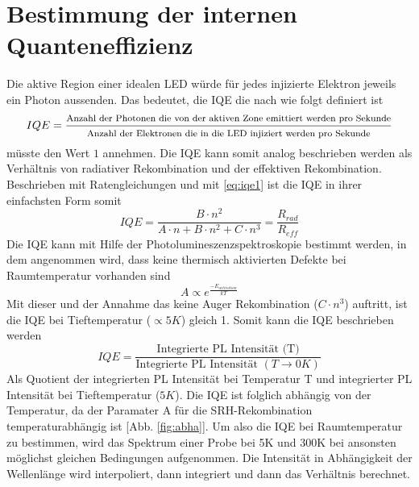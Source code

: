 
\section{Bestimmung der internen Quanteneffizienz}
\thispagestyle{fancy}

Die aktive Region einer idealen LED würde für jedes injizierte Elektron jeweils ein Photon aussenden. 
Das bedeutet, die IQE die nach \cite{schub} wie folgt definiert ist
\begin{equation}
    IQE = \frac{ \footnotesize \text{Anzahl der Photonen die von der aktiven Zone emittiert werden pro Sekunde}}{ \footnotesize \text{Anzahl der Elektronen die in die LED injiziert werden pro Sekunde}}
\end{equation}
müsste den Wert $1$ annehmen. Die IQE kann somit analog beschrieben werden als Verhältnis von radiativer Rekombination und der effektiven Rekombination. Beschrieben mit Ratengleichungen und mit \ref{eq:iqe1} ist die IQE in ihrer einfachsten Form somit
\begin{equation}
    IQE = \frac{B \cdot n^2}{A \cdot n + B \cdot n^2 + C \cdot n^3} = \frac{R_{rad}}{R_{eff}}
\end{equation}
Die IQE kann mit Hilfe der Photolumineszenzspektroskopie bestimmt werden, in dem angenommen wird, dass keine thermisch aktivierten Defekte bei Raumtemperatur vorhanden sind
\begin{equation}
    A \propto e^{\frac{-E_{activation}}{kT}}
\end{equation}
Mit dieser und der Annahme das keine Auger Rekombination ($ C \cdot n^3 $) auftritt, ist die IQE bei Tieftemperatur ($ \propto 5K$) gleich 1. Somit kann die IQE beschrieben werden
\begin{equation}
    IQE = \frac{\text{Integrierte PL Intensität (T)}}{ \text{Integrierte PL Intensität } (T \rightarrow 0 K) }
    \label{eq:standardiqe}
\end{equation}
Als Quotient der integrierten PL Intensität bei Temperatur T und integrierter PL Intensität bei Tieftemperatur ($5K$). Die IQE ist folglich abhängig von der Temperatur, da der Paramater A für die SRH-Rekombination temperaturabhängig ist [Abb. \ref{fig:abha}]. 
Um also die IQE bei Raumtemperatur zu bestimmen, wird das Spektrum einer Probe bei 5K und 300K bei ansonsten möglichst gleichen Bedingungen aufgenommen. Die Intensität in Abhängigkeit der Wellenlänge wird interpoliert, dann integriert und dann das Verhältnis berechnet.
%
